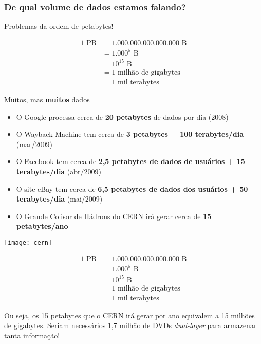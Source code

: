 \documentclass[Ligatures=TeX,table,brazil,svgnames,usetotalslideindicator,comp
ress,10pt]{beamer}
\begin{document}
\begin{frame}
  \frametitle{De qual volume de dados estamos falando?}

   {
    \begin{block}{}
      Problemas da ordem de \alert{petabytes}!
    \end{block}
    \begin{align*}
      1 \text{ PB} &= 1.000.000.000.000.000 \text{ B}\\
           &= 1.000^5 \text{ B}\\
           &= 10^{15} \text{ B}\\
           &= 1 \text{ milhão de gigabytes}\\
           &= 1 \text{ mil terabytes}
    \end{align*}
  }

   {
  \begin{block}{Muitos, mas \textbf{muitos} dados}
    \begin{itemize}
    \item<2-> O Google processa cerca de \textbf{20 petabytes} de dados
      por dia (2008)
    \item<3-> O Wayback Machine tem cerca de \textbf{3 petabytes + 100
        terabytes/dia} (mar/2009)
    \item<4-> O Facebook tem cerca de \textbf{2,5 petabytes de dados de
        usuários + 15 terabytes/dia} (abr/2009)
    \item<5-> O site eBay tem cerca de \textbf{6,5 petabytes de dados dos usuários + 50 terabytes/dia} (mai/2009)
    \item<6-> O Grande Colisor de Hádrons do CERN irá gerar cerca de \textbf{15 petabytes/ano}
    \end{itemize}
  \end{block}
  }

   {
    \texttt{[image: cern]}
  }

   {
    \begin{align*}
      1 \text{ PB} &= 1.000.000.000.000.000 \text{ B}\\
           &= 1.000^5 \text{ B}\\
           &= 10^{15} \text{ B}\\
           &= 1 \text{ milhão de gigabytes}\\
           &= 1 \text{ mil terabytes}
    \end{align*}

  \begin{block}{}
    Ou seja, os \alert{15 petabytes} que o CERN irá gerar por ano equivalem a \alert{15
    milhões de gigabytes}. Seriam necessários \alert{1,7 milhão de DVDs
    \textit{dual-layer}} para armazenar tanta informação!
  \end{block}
  }

\end{frame}
\end{document}

